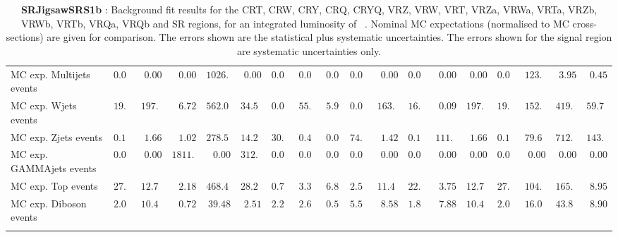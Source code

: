 \begin{table}
{\begin{tabular*}{\textwidth}{@{\extracolsep{\fill}}lrrrrrrrrrrrrrrrrr}
\noalign{\smallskip}\hline\noalign{\smallskip}
        MC exp. Multijets events         & $0.00$          & $0.00$          & $0.00$          & $1026.97$          & $0.00$          & $0.00$          & $0.00$          & $0.00$          & $0.00$          & $0.00$          & $0.00$          & $0.00$          & $0.00$          & $0.00$          & $123.62$          & $3.95$          & $0.45$              \\
        MC exp. Wjets events         & $19.91$          & $197.80$          & $6.72$          & $562.06$          & $34.57$          & $0.01$          & $55.29$          & $5.99$          & $0.02$          & $163.11$          & $16.14$          & $0.09$          & $197.80$          & $19.91$          & $152.12$          & $419.57$          & $59.76$              \\
        MC exp. Zjets events         & $0.18$          & $1.66$          & $1.02$          & $278.59$          & $14.26$          & $30.29$          & $0.48$          & $0.09$          & $74.01$          & $1.42$          & $0.16$          & $111.72$          & $1.66$          & $0.18$          & $79.63$          & $712.74$          & $143.83$              \\
        MC exp. GAMMAjets events         & $0.00$          & $0.00$          & $1811.20$          & $0.00$          & $312.71$          & $0.00$          & $0.00$          & $0.00$          & $0.00$          & $0.00$          & $0.00$          & $0.00$          & $0.00$          & $0.00$          & $0.00$          & $0.00$          & $0.00$              \\
        MC exp. Top events         & $27.15$          & $12.74$          & $2.18$          & $468.48$          & $28.27$          & $0.79$          & $3.37$          & $6.83$          & $2.50$          & $11.43$          & $22.31$          & $3.75$          & $12.74$          & $27.15$          & $104.54$          & $165.46$          & $8.95$              \\
        MC exp. Diboson events         & $2.09$          & $10.46$          & $0.72$          & $39.48$          & $2.51$          & $2.26$          & $2.61$          & $0.54$          & $5.54$          & $8.58$          & $1.82$          & $7.88$          & $10.46$          & $2.09$          & $16.03$          & $43.80$          & $8.90$              \\
\noalign{\smallskip}\hline\noalign{\smallskip}
\end{tabular*}
}
\caption{{\bf SRJigsawSRS1b} : Background fit results for the CRT, CRW, CRY, CRQ, CRYQ, VRZ, VRW, VRT, VRZa, VRWa, VRTa, VRZb, VRWb, VRTb, VRQa, VRQb and SR regions, for an integrated luminosity of \ourintlumi~\ifb. Nominal MC expectations (normalised to MC cross-sections) are given for comparison. The errors shown are the statistical plus systematic uncertainties. The errors shown for the signal region are systematic uncertainties only.}
\label{table.results.systematics.in.logL.fit.CRT.CRW.CRY.CRQ.CRYQ.VRZ.VRW.VRT.VRZa.VRWa.VRTa.VRZb.VRWb.VRTb.VRQa.VRQb.SR.SRJigsawSRS1b}
\end{table}
%